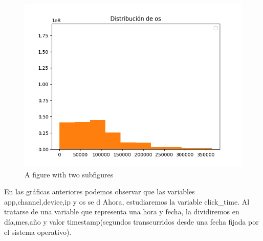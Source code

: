 \begin{figure}[H]
	\centering
\includegraphics[scale=0.5]{img/os_distribution.png}
\caption{A figure with two subfigures}
\label{fig:test}	
\end{figure}
En las gráficas anteriores podemos observar que las variables app,channel,device,ip y os se d
\medskip
Ahora, estudiaremos la variable click\_time. Al tratarse de una variable que representa una hora y fecha, la dividiremos en día,mes,año y valor timestamp(segundos transcurridos desde una fecha fijada por el sistema operativo).
